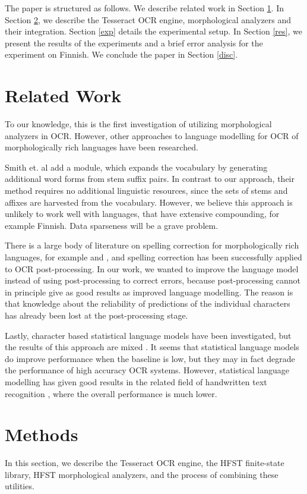 \documentclass[b5paper]{article}
\begin{document}
The paper is structured as follows. We describe related work in
Section \ref{rel}. In Section \ref{met}, we describe the Tesseract OCR
engine, morphological analyzers and their integration. Section
\ref{exp} details the experimental setup. In Section \ref{res}, we
present the results of the experiments and a brief error analysis for
the experiment on Finnish. We conclude the paper in Section
\ref{disc}.

\section{Related Work}
\label{rel}
To our knowledge, this is the first investigation of utilizing
morphological analyzers in OCR. However, other approaches to language
modelling for OCR of morphologically rich languages have been
researched.

Smith et. al \cite{smith09} add a module, which expands the vocabulary
by generating additional word forms from stem suffix pairs. In
contrast to our approach, their method requires no additional
linguistic resources, since the sets of stems and affixes are
harvested from the vocabulary. However, we believe this approach is
unlikely to work well with languages, that have extensive compounding,
for example Finnish. Data sparseness will be a grave problem.

There is a large body of literature on spelling correction for
morphologically rich languages, for example \cite{oflazer94} and
\cite{pirinen12}, and spelling correction has been successfully
applied to OCR post-processing. In our work, we wanted to improve the
language model instead of using post-processing to correct errors,
because post-processing cannot in principle give as good results as
improved language modelling. The reason is that knowledge about the
reliability of predictions of the individual characters has already
been lost at the post-processing stage.

Lastly, character based statistical language models have been
investigated, but the results of this approach are mixed
\cite{smith11}. It seems that statistical language models do improve
performance when the baseline is low, but they may in fact degrade
the performance of high accuracy OCR systems. However, statistical
language modelling has given good results in the related field of
handwritten text recognition \cite{marti01}, where the overall
performance is much lower.

\section{Methods}
\label{met} In this section, we describe the Tesseract OCR engine, the
HFST finite-state library, HFST morphological analyzers, and the
process of combining these utilities.
\end{document}
